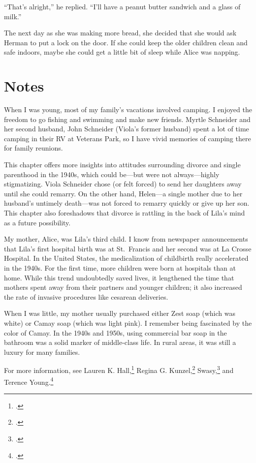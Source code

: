 \documentclass[
  american,
  letterpaper,
]{book}
\begin{document}
``That's alright,'' he replied. ``I'll have a peanut butter sandwich and
a glass of milk.''

The next day as she was making more bread, she decided that she would
ask Herman to put a lock on the door. If she could keep the older
children clean and safe indoors, maybe she could get a little bit of
sleep while Alice was napping.

\section{Notes}\label{notes-42}

When I was young, most of my family's vacations involved camping. I
enjoyed the freedom to go fishing and swimming and make new friends.
Myrtle Schneider and her second husband, John Schneider (Viola's former
husband) spent a lot of time camping in their RV at Veterans Park, so I
have vivid memories of camping there for family reunions.

This chapter offers more insights into attitudes surrounding divorce and
single parenthood in the 1940s, which could be---but were not
always---highly stigmatizing. Viola Schneider chose (or felt forced) to
send her daughters away until she could remarry. On the other hand,
Helen---a single mother due to her husband's untimely death---was not
forced to remarry quickly or give up her son. This chapter also
foreshadows that divorce is rattling in the back of Lila's mind as a
future possibility.

My mother, Alice, was Lila's third child. I know from newspaper
announcements that Lila's first hospital birth was at St.~Francis and
her second was at La Crosse Hospital. In the United States, the
medicalization of childbirth really accelerated in the 1940s. For the
first time, more children were born at hospitals than at home. While
this trend undoubtedly saved lives, it lengthened the time that mothers
spent away from their partners and younger children; it also increased
the rate of invasive procedures like cesarean deliveries.

When I was little, my mother usually purchased either Zest soap (which
was white) or Camay soap (which was light pink). I remember being
fascinated by the color of Camay. In the 1940s and 1950s, using
commercial bar soap in the bathroom was a solid marker of middle-class
life. In rural areas, it was still a luxury for many families.

For more information, see Lauren K. Hall,\footnote{.} Regina G. Kunzel,\footnote{.} Swasy,\footnote{.} and Terence Young.\footnote{.}
\end{document}
